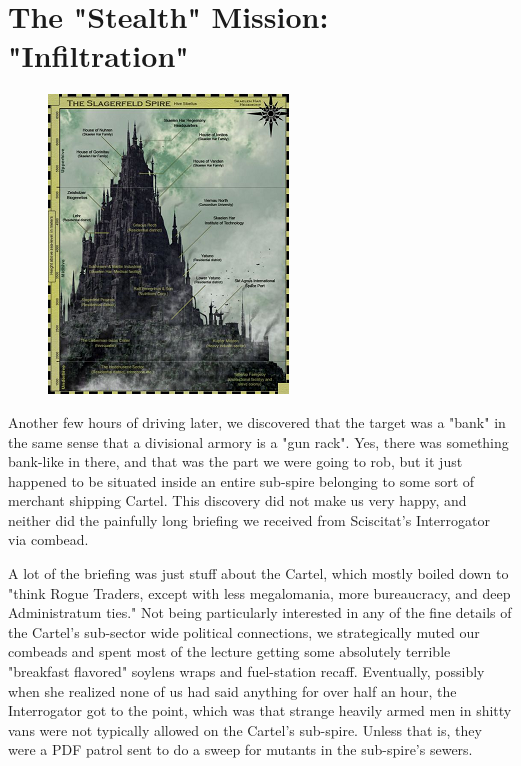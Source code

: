 \chapter{The "Stealth" Mission: "Infiltration"}

\begin{figure}
	\begin{center}
		\includegraphics[width=\figwidth]{pics/18/1.png}
	\end{center}
\end{figure}
Another few hours of driving later, we discovered that the target was a "bank" in the same sense that a divisional armory is a "gun rack". 
Yes, there was something bank-like in there, and that was the part we were going to rob, but it just happened to be situated inside an entire sub-spire belonging to some sort of merchant shipping Cartel. 
This discovery did not make us very happy, and neither did the painfully long briefing we received from Sciscitat's Interrogator via combead. 


A lot of the briefing was just stuff about the Cartel, which mostly boiled down to "think Rogue Traders, except with less megalomania, more bureaucracy, and deep Administratum ties." Not being particularly interested in any of the fine details of the Cartel's sub-sector wide political connections, we strategically muted our combeads and spent most of the lecture getting some absolutely terrible "breakfast flavored" soylens wraps and fuel-station recaff. 
Eventually, possibly when she realized none of us had said anything for over half an hour, the Interrogator got to the point, which was that strange heavily armed men in shitty vans were not typically allowed on the Cartel's sub-spire. 
Unless that is, they were a PDF patrol sent to do a sweep for mutants in the sub-spire's sewers.

